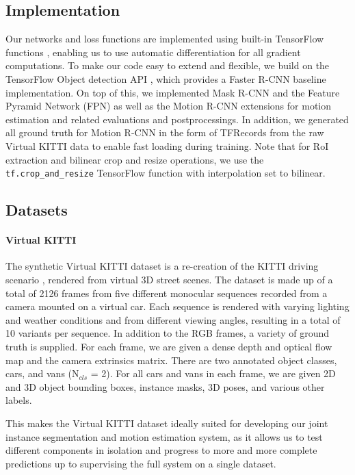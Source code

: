 \subsection{Implementation}
Our networks and loss functions are implemented using built-in TensorFlow
functions \cite{TensorFlow}, enabling us to use automatic differentiation for all gradient
computations. To make our code easy to extend and flexible, we build on
the TensorFlow Object detection API \cite{TensorFlowObjectDetection}, which provides a Faster R-CNN baseline
implementation.
On top of this, we implemented Mask R-CNN and the Feature Pyramid Network (FPN)
as well as the Motion R-CNN extensions for motion estimation and related evaluations
and postprocessings. In addition, we generated all ground truth for
Motion R-CNN in the form of TFRecords from the raw Virtual KITTI
data to enable fast loading during training.
Note that for RoI extraction and bilinear crop and resize operations,
we use the \texttt{tf.crop\_and\_resize} TensorFlow function with
interpolation set to bilinear.

\subsection{Datasets}
\label{ssec:datasets}

\paragraph{Virtual KITTI}
The synthetic Virtual KITTI dataset \cite{VKITTI} is a re-creation of the KITTI
driving scenario \cite{KITTI2012, KITTI2015}, rendered from virtual 3D street
scenes.
The dataset is made up of a total of 2126 frames from five different monocular
sequences recorded from a camera mounted on a virtual car.
Each sequence is rendered with varying lighting and weather conditions and
from different viewing angles, resulting in a total of 10 variants per sequence.
In addition to the RGB frames, a variety of ground truth is supplied.
For each frame, we are given a dense depth and optical flow map and the camera
extrinsics matrix. There are two annotated object classes, cars, and vans (N$_{cls}$ = 2).
For all cars and vans in each frame, we are given 2D and 3D object bounding
boxes, instance masks, 3D poses, and various other labels.

This makes the Virtual KITTI dataset ideally suited for developing our joint
instance segmentation and motion estimation system, as it allows us to test
different components in isolation and progress to more and more complete
predictions up to supervising the full system on a single dataset.

